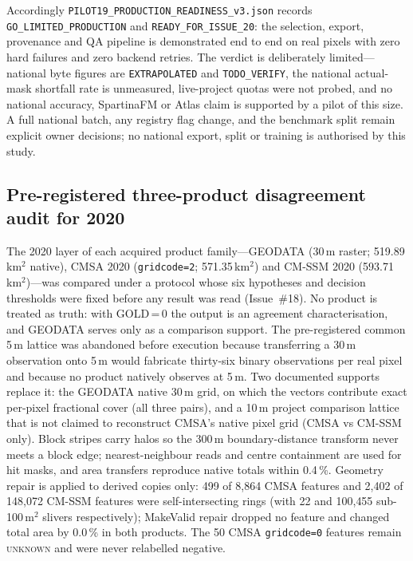 Accordingly \texttt{PILOT19\_PRODUCTION\_READINESS\_v3.json} records
\texttt{GO\_LIMITED\_PRODUCTION} and
\texttt{READY\_FOR\_ISSUE\_20}: the selection, export, provenance and
QA pipeline is demonstrated end to end on real pixels with zero hard
failures and zero backend retries. The verdict is deliberately
limited---national byte figures are \texttt{EXTRAPOLATED} and
\texttt{TODO\_VERIFY}, the national actual-mask shortfall rate is
unmeasured, live-project quotas were not probed, and no national
accuracy, SpartinaFM or Atlas claim is supported by a pilot of this
size. A full national batch, any registry flag change, and the
benchmark split remain explicit owner decisions; no national export,
split or training is authorised by this study.



\subsection{Pre-registered three-product disagreement audit for 2020}
\label{sec:issue18}
The 2020 layer of each acquired product family---GEODATA (30\,m raster;
519.89\,km$^2$ native), CMSA 2020 (\texttt{gridcode=2}; 571.35\,km$^2$)
and CM-SSM 2020 (593.71\,km$^2$)---was compared under a protocol whose
six hypotheses and decision thresholds were fixed before any result was
read (Issue~\#18). No product is treated as truth: with GOLD\,=\,0 the
output is an agreement characterisation, and GEODATA serves only as a
comparison support. The pre-registered common 5\,m lattice was abandoned
before execution because transferring a 30\,m observation onto 5\,m
would fabricate thirty-six binary observations per real pixel and
because no product natively observes at 5\,m. Two documented supports
replace it: the GEODATA native 30\,m grid, on which the vectors
contribute exact per-pixel fractional cover (all three pairs), and a
10\,m project comparison lattice that is not claimed to reconstruct
CMSA's native pixel grid (CMSA vs CM-SSM only). Block stripes carry
halos so the 300\,m boundary-distance transform never meets a block
edge; nearest-neighbour reads and centre containment are used for hit
masks, and area transfers reproduce native totals within 0.4\,\%.
Geometry repair is applied to derived copies only: 499 of 8{,}864 CMSA
features and 2{,}402 of 148{,}072 CM-SSM features were self-intersecting
rings (with 22 and 100{,}455 sub-100\,m$^2$ slivers respectively);
MakeValid repair dropped no feature and changed total area by 0.0\,\% in
both products. The 50 CMSA \texttt{gridcode=0} features remain
\textsc{unknown} and were never relabelled negative.

